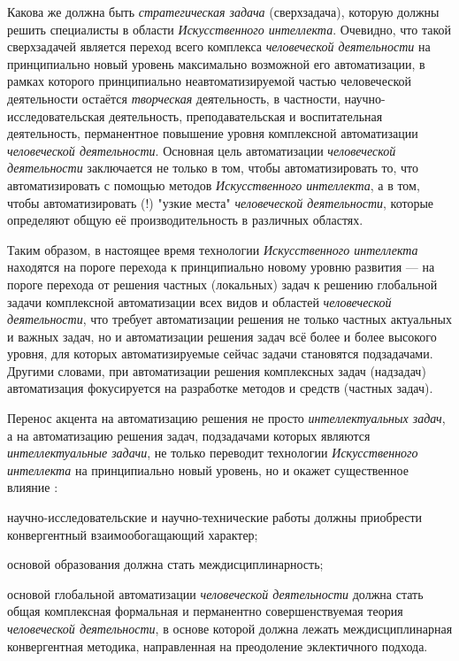 Какова же должна быть \textit{стратегическая задача} (сверхзадача), которую должны решить специалисты в области \textit{Искусственного интеллекта}. Очевидно, что такой сверхзадачей является переход всего комплекса \textit{человеческой деятельности} на принципиально новый уровень максимально возможной его автоматизации, в рамках которого принципиально неавтоматизируемой частью человеческой деятельности остаётся \textit{творческая} деятельность, в частности, научно-исследовательская деятельность, преподавательская и воспитательная деятельность, перманентное повышение уровня комплексной автоматизации \textit{человеческой деятельности}. Основная цель  автоматизации \textit{человеческой деятельности} заключается не только в том, чтобы автоматизировать то, что  автоматизировать с помощью методов \textit{Искусственного интеллекта}, а в том, чтобы автоматизировать (!) "узкие места"{} \textit{человеческой деятельности}, которые определяют общую её производительность в различных областях.

Таким образом, в настоящее время технологии \textit{Искусственного интеллекта} находятся на пороге перехода к принципиально новому уровню развития --- на пороге перехода от решения частных (локальных) задач к решению глобальной задачи комплексной автоматизации всех видов и областей \textit{человеческой деятельности}, что требует автоматизации решения не только частных актуальных и важных задач, но и автоматизации решения задач всё более и более высокого уровня, для которых автоматизируемые сейчас задачи становятся подзадачами. Другими словами, при автоматизации решения комплексных задач (надзадач) автоматизация фокусируется на разработке методов и средств  (частных задач).

Перенос акцента на автоматизацию решения не просто \textit{интеллектуальных задач}, а на автоматизацию решения  задач, подзадачами которых являются  \textit{интеллектуальные задачи}, не только переводит технологии \textit{Искусственного интеллекта} на принципиально новый уровень, но и окажет существенное влияние :
\begin{textitemize}
	\item  научно-исследовательские и научно-технические работы должны приобрести конвергентный взаимообогащающий характер;
	\item основой образования должна стать междисциплинарность;
	\item основой глобальной автоматизации \textit{человеческой деятельности} должна стать общая комплексная формальная и перманентно совершенствуемая теория \textit{человеческой деятельности}, в основе которой должна лежать междисциплинарная конвергентная методика, направленная на преодоление эклектичного подхода.
\end{textitemize}


